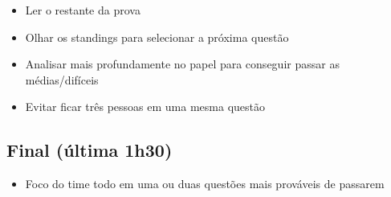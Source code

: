 \begin{itemize}
	\item Ler o restante da prova
	\item Olhar os standings para selecionar a próxima questão
	\item Analisar mais profundamente no papel para conseguir passar as médias/difíceis
	\item Evitar ficar três pessoas em uma mesma questão
\end{itemize}

\subsection{Final (última 1h30)}

\begin{itemize}
	\item Foco do time todo em uma ou duas questões mais prováveis de passarem
\end{itemize}

\pagebreak